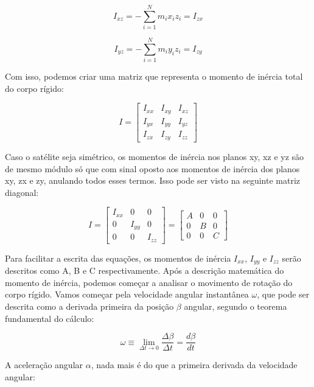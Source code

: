 \begin{equation}
  I_{xz}=-\sum_{i=1}^{N}{m_ix_iz_i}=I_{zx}
\end{equation}

\begin{equation}
  I_{yz}=-\sum_{i=1}^{N}{m_iy_iz_i}=I_{zy}
\end{equation}

Com isso, podemos criar uma matriz que representa o momento de inércia total do corpo rígido:

\begin{equation}\label{eq:nsimetrico}
I=\begin{bmatrix}I_{xx}&I_{xy}&I_{xz}\\I_{yx}&I_{yy}&I_{yz}\\I_{zx}&I_{zy}&I_{zz}\end{bmatrix}
\end{equation}

Caso o satélite seja simétrico, os momentos de inércia nos planos xy, xz e yz são de mesmo módulo só que com sinal oposto aos momentos de inércia dos planos xy, zx e zy, anulando todos esses termos. Isso pode ser visto na seguinte matriz diagonal:

\begin{equation}
I=\begin{bmatrix} I_{ xx } & 0 & 0 \\ 0 & I_{ yy } & 0 \\ 0 & 0 & I_{ zz } \end{bmatrix}=\begin{bmatrix} A & 0 & 0 \\ 0 & B & 0 \\ 0 & 0 & C \end{bmatrix}
\end{equation}

Para facilitar a escrita das equações, os momentos de inércia $I_{xx}$, $I_{yy}$ e $I_{zz}$ serão descritos como A, B e C respectivamente. Após a descrição matemática do momento de inércia, podemos começar a analisar o movimento de rotação do corpo rígido. Vamos começar pela velocidade angular instantânea $\omega$, que pode ser descrita como a derivada primeira da posição $\beta$ angular, segundo o teorema fundamental do cálculo:

\begin{equation}
\omega\equiv\lim_{\Delta t\rightarrow 0}\frac{\Delta\beta}{\Delta t}=\frac{d\beta}{dt}
\end{equation}

A aceleração angular $\alpha$, nada mais é do que a primeira derivada da velocidade angular:

